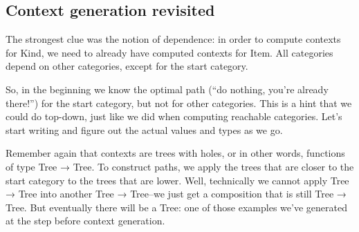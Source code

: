 \subsection{Context generation revisited}

The strongest clue was the notion of dependence: in order to compute contexts for Kind, we need to already have computed contexts for Item. All categories depend on other categories, except for the start category.

So, in the beginning we know the optimal path (“do nothing, you’re already there!”) for the start category, but not for other categories. This is a hint that we could do top-down, just like we did when computing reachable categories. Let’s start writing and figure out the actual values and types as we go.

Remember again that contexts are trees with holes, or in other words, functions of type Tree → Tree. To construct paths, we apply the trees that are closer to the start category to the trees that are lower. Well, technically we cannot apply Tree → Tree into another Tree → Tree–we just get a composition that is still Tree → Tree. But eventually there will be a Tree: one of those examples we’ve generated at the step before context generation. 


